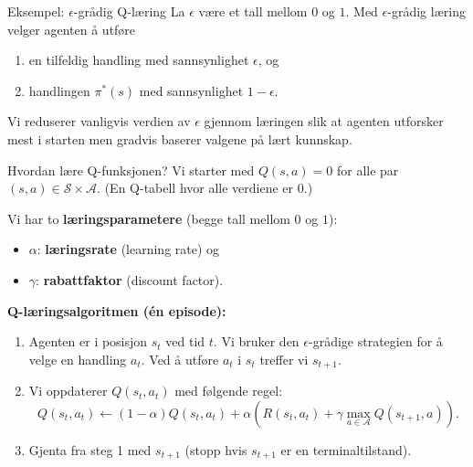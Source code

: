 \documentclass[UKenglish]{beamer}
\begin{document}
\begin{frame}{Eksempel: $\epsilon$-grådig Q-læring}
	La $\epsilon$ være et tall mellom $0$ og $1$. Med $\epsilon$-grådig læring velger agenten å utføre
	
	\vspace{1em}
	
	\begin{enumerate}
	\setlength\itemsep{2em}
	\item en tilfeldig handling med sannsynlighet $\epsilon$, og
	\item handlingen $\pi^*(s)$ med sannsynlighet $1-\epsilon$.
	\end{enumerate}

	\vspace{1em}
	
	
	Vi reduserer vanligvis verdien av $\epsilon$ gjennom læringen slik at agenten utforsker mest i starten men gradvis baserer valgene på lært kunnskap.

\end{frame}

\hidelogo
\begin{frame}{Hvordan lære Q-funksjonen?}
	Vi starter med $Q(s,a)=0$ for alle par $(s,a)\in\mathcal{S}\times\mathcal{A}$. (En Q-tabell hvor alle verdiene er $0$.)
	
	\vspace{1em}
	
	\pause
	
	Vi har to \textbf{læringsparametere} (begge tall mellom $0$ og $1$):
	\begin{itemize}
		\item $\alpha$: \textbf{læringsrate} (learning rate) og
		\item $\gamma$: \textbf{rabattfaktor} (discount factor).
	\end{itemize}
	
	\pause
	
	\vspace{1em}
	\textbf{Q-læringsalgoritmen (én episode):}
	
	\begin{enumerate}
		\item Agenten er i posisjon $s_t$ ved tid $t$. Vi bruker den $\epsilon$-grådige strategien for å velge en handling $a_t$. Ved å utføre $a_t$ i $s_t$ treffer vi $s_{t+1}$.
		
		\pause
		
		\item Vi oppdaterer $Q(s_t,a_t)$ med følgende regel:
		$$
		Q(s_t, a_t)\leftarrow(1-\alpha)Q(s_t, a_t)+\alpha\left(R(s_t, a_t)+\gamma\max_{a\in\mathcal{A}} Q(s_{t+1}, a)\right).
		$$
		
		\pause
		
		\item Gjenta fra steg 1 med $s_{t+1}$ (stopp hvis $s_{t+1}$ er en terminaltilstand).
	\end{enumerate}

\end{frame}
\end{document}
